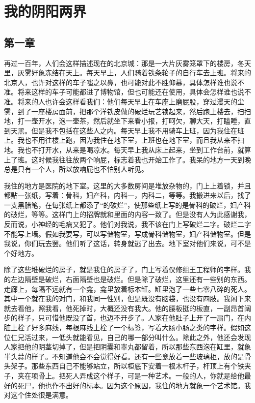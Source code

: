 \chapter{我的阴阳两界}

\section{第一章}



再过一百年，人们会这样描述现在的北京城：那是一大片灰雾笼罩下的楼房，冬天里，灰雾好象冻结在天上。每天早上，人们骑着铁条轮子的自行车去上班。将来的北京人，也许对这样的车子嗤之以鼻，也可能对此不胜仰慕，具体怎样谁也说不准。将来这样的车子可能都进了博物馆，但也可能还在使用，具体会怎样谁也说不准。将来的人也许会这样看我们：他们每天早上在车座上磨屁股，穿过漫天的尘雾，到了一座楼房面前，把那个洋铁皮做的破烂玩艺锁起来，然后跑上楼去，扫扫地，打一壶开水，泡一壶茶，然后就坐下来看小报，打呵欠，聊大天，打瞌睡，直到天黑。但是我不包括在这些人之内。每天早上我不用骑车上班，因为我住在班上。我也不用往楼上跑，因为我住在地下室，上班也在地下室，而且我从来不扫地。我也不打开水，从来是喝凉水。每天早上我从床上起来，坐到工作台前，就算上了班。这时候我往往放两个响屁，标志着我也开始工作了。我呆的地方一天到晚总是只有一个人，所以放响屁也不怕别人听见。 

我住的地方是医院的地下室。这里的大多数房间是堆放杂物的，门上上着锁，并且都贴一张纸，写着：骨科，妇产科，内科一，内科二，等等。我搬进来以后，找了一支黑腊笔，在每张纸上都添了“的破烂”，使那些纸上写的是骨科的破烂，妇产科的破烂，等等。这样门上的招牌就和里面的内容一致了。但是没有人为此感谢我，反而说，小神经的毛病又犯了。他们对我说，我不该在门上写破烂二字。破烂二字不能写上墙。假如我要写，可以写储物室，写成骨科储物室，妇产科储物室。但是我说，你们玩去罢。他们听了这话，转身就逃了出去。地下室对他们来说，可不是个好地方。 

除了这些堆破烂的房子，就是我住的房子了，门上写着仪修组王工程师的字样。我的左边隔壁是破烂，右面隔壁也是破烂。但是除了破烂，这里还有一些别的东西。走廊上，每隔不远就有一个龛，龛里放着标本缸。缸里泡了一些七零八碎的死人。其中一个就在我的对门，和我同一性别，但是既没有脑袋，也没有四肢。我闲下来就去看他，照我看，他死掉时，大概还没有我大。他的腰板挺的板直，一副昂首阔步的样子，只可惜他既没了首，也迈不开步了。人家在他肚子上开了一扇门，在内脏上栓了好多麻线，每根麻线上栓了一个标签，写着大肠小肠之类的字样。假如这位仁兄活过来，一低头就能看见，自己的哪一部分叫什么。除此之外，他还会发现人家把他的阴茎切掉了，但是把阴囊和睾丸都留着，所以那些东西泡在缸里，就象半头蒜的样子。不知道他会不会觉得好看。还有一些龛放着一些玻璃柜，放的是骨头架子。那些东西自己不能够站立，所以柜底下安着一根木杆子，杆顶上有个铁夹子，夹在项骨上。把死人弄成这个样子，可是一种艺术。一般的人，你就是给他最好的死尸，他也作不出好的标本。因为这个原因，我住的地方就象一个艺术馆。我对这个住处很是满意。 

